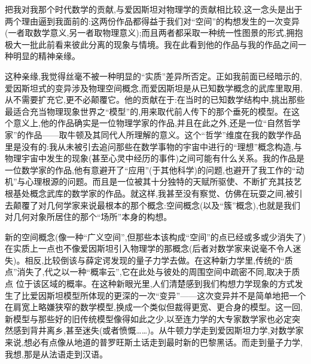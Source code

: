  把我对我那个时代数学的贡献,与爱因斯坦对物理学的贡献相比较,这一念头是出于两个理由逼到我面前的:这两份作品都得益于我们对“空间”的构想发生的一次变异(一者取数学意义,另一者取物理意义);而且两者都采取一种统一性图景的形式,拥抱极大一批此前看来彼此分离的现象与情境。我在此看到他的作品与我的作品之间一种明显的精神亲缘。

这种亲缘,我觉得丝毫不被一种明显的“实质”差异所否定。正如我前面已经暗示的,爱因斯坦式的变异涉及物理空间概念,而爱因斯坦是从已知数学概念的武库里取用,从不需要扩充它,更不必颠覆它。他的贡献在于:在当时的已知数学结构中,挑出那些最适合充当物理现象世界之“模型”的,用来取代前人传下的那个垂死的模型。在这个意义上,他的作品确实是一位物理学家的作品,并且在此之外,还是一位“自然哲学家”的作品——取牛顿及其同代人所理解的意义。这个“哲学”维度在我的数学作品里是没有的:我从未被引去追问那些在数学事物的宇宙中进行的“理想”概念构造,与物理宇宙中发生的现象(甚至心灵中经历的事件)之间可能有什么关系。我的作品是一位数学家的作品,他有意避开了“应用”(于其他科学)的问题,也避开了我工作的“动机”与心理根源的问题。而且是一位被其十分独特的天赋所驱使、不断扩充其技艺根基处概念武库的数学家的作品。就这样,我甚至没有察觉、仿佛在玩耍之间,被引去颠覆了对几何学家来说最根本的那个概念:空间概念(以及“簇”概念),也就是我们对几何对象所居住的那个“场所”本身的构想。

新的空间概念(像一种“广义空间”,但那些本该构成“空间”的点已经或多或少消失了)在实质上一点也不像爱因斯坦引入物理学的那概念(后者对数学家来说毫不令人迷失)。相反,比较倒该与薛定谔发现的量子力学去做。在这种新力学里,传统的“质点”消失了,代之以一种“概率云”,它在此处与彼处的周围空间中疏密不同,取决于质点
 位于该区域的概率。在这种新眼光里,人们清楚感到我们构想力学现象的方式发生了比爱因斯坦模型所体现的更深的一次“变异”——这次变异并不是简单地把一个在肩宽上略嫌狭窄的数学模型,换成一个类似但裁得更宽、更合身的模型。这一回,新模型与那些好的旧传统模型像得如此之少,以至连力学的大专家数学家也必定突然感到背井离乡,甚至迷失(或者愤慨……)。从牛顿力学走到爱因斯坦力学,对数学家来说,想必有点像从地道的普罗旺斯土话走到最时新的巴黎黑话。而走到量子力学,我想,那是从法语走到汉语。

